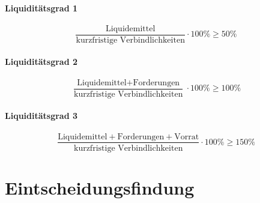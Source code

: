 \documentclass[../main.tex]{subfiles}
\begin{document}
            \paragraph{Liquiditätsgrad 1}
                \begin{equation}
                    \frac{\text{Liquidemittel}}{\text{kurzfristige Verbindlichkeiten}} \cdot 100\% \geq 50\%
                \end{equation}
                
            \paragraph{Liquiditätsgrad 2}
                \begin{equation}
                    \frac{\text{Liquidemittel} + \text{Forderungen}}{\text{kurzfristige Verbindlichkeiten}} \cdot 100\% \geq 100\%
                \end{equation}
                
            \paragraph{Liquiditätsgrad 3}
                \begin{equation}
                    \frac{\text{Liquidemittel} + \text{Forderungen} + \text{Vorrat}}{\text{kurzfristige Verbindlichkeiten}} \cdot 100\% \geq 150\%
                \end{equation}        
    
    \section{Eintscheidungsfindung}
        
\end{document}
